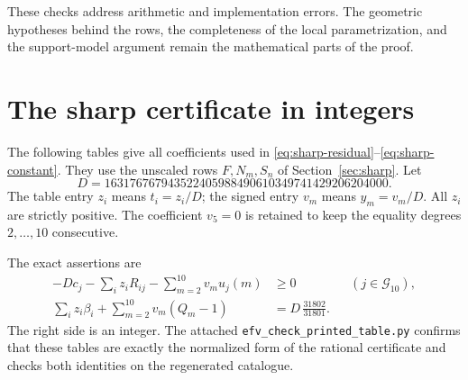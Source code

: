 \documentclass[12pt,a4paper]{article}
\numberwithin{equation}{section}
\theoremstyle{definition}
\newcommand{\ccat}{\mathscr G}
\begin{document}
These checks address arithmetic and implementation errors.
The geometric hypotheses behind the rows, the completeness of the
local parametrization, and the support-model argument remain the
mathematical parts of the proof.

\section{The sharp certificate in integers}\label{app:sharp-table}

The following tables give all coefficients used in
\eqref{eq:sharp-residual}--\eqref{eq:sharp-constant}.
They use the unscaled rows \(F,N_m,S_n\) of
Section~\ref{sec:sharp}.
Let
\begin{equation}\label{eq:common-denominator}
                 D=163176767943522405988490610349741429206204000.
\end{equation}
The table entry \(z_i\) means \(t_i=z_i/D\); the signed entry \(v_m\)
means \(y_m=v_m/D\).
All \(z_i\) are strictly positive.
The coefficient \(v_5=0\) is retained to keep the equality degrees
\(2,\ldots,10\) consecutive.

The exact assertions are
\begin{align}
 -Dc_j-\sum_i z_iR_{ij}-\sum_{m=2}^{10}v_mu_j(m)&\geq0
                                      &&(j\in\ccat_{10}),\label{eq:integer-sharp}\\
 \sum_i z_i\beta_i+\sum_{m=2}^{10}v_m(Q_m-1)
              &=D\,\frac{31802}{31801}.\label{eq:integer-sharp-rhs}
\end{align}
The right side is an integer. The attached
\texttt{efv\_check\_printed\_table.py} confirms that these tables are
exactly the normalized form of the rational certificate and checks
both identities on the regenerated catalogue.
\end{document}
